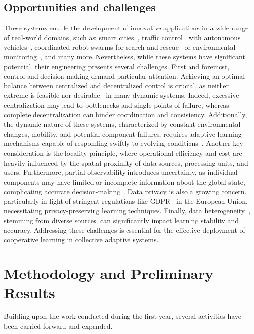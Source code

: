 \documentclass[runningheads]{llncs}
\begin{document}
\subsection{Opportunities and challenges}
These systems enable the development of innovative applications in a wide range of real-world domains, such as: 
 smart cities~\cite{DBLP:conf/icse/IftikharRBW017}, 
 traffic control~\cite{DBLP:journals/tits/ChuWCL20,DBLP:books/sp/Muller2011/ProthmannTBHMS11} 
 with autonomous vehicles~\cite{DBLP:journals/corr/BojarskiTDFFGJM16}, 
 coordinated robot swarms for search and rescue~\cite{DBLP:journals/ijon/ZhouLLXS21} 
 or environmental monitoring~\cite{DBLP:conf/acsos/AguzziVE23}, and many more.
%
Nevertheless, while these systems have significant potential, their engineering 
 presents several challenges.
%
First and foremost, control and decision-making demand particular attention.
%
Achieving an optimal balance between centralized and decentralized control is crucial, 
 as neither extreme is feasible nor desirable~\cite{DBLP:conf/coordination/CasadeiPVN19,DBLP:journals/tits/ChuWCL20,DBLP:journals/jair/LyuBXDA23} 
 in many dynamic systems. 
% 
Indeed, excessive centralization may lead to bottlenecks and single points of failure, 
 whereas complete decentralization can hinder coordination and consistency.
%
Additionally, the dynamic nature of these systems, characterized by constant 
 environmental changes, mobility, and potential component failures, requires adaptive 
 learning mechanisms capable of responding swiftly 
 to evolving conditions~\cite{DBLP:journals/swarm/PrasetyoMF19}.
%
Another key consideration is the locality principle, where operational efficiency and cost 
 are heavily influenced by the spatial proximity of data sources, processing units, and users.
%
Furthermore, partial observability introduces uncertainty, as individual components may have 
 limited or incomplete information about the global state, complicating accurate 
 decision-making~\cite{DBLP:conf/uai/HeDB22}.
%
Data privacy is also a growing concern, particularly in light of stringent regulations like GDPR~\cite{GDPR}
 in the European Union, necessitating privacy-preserving learning techniques.
%
Finally, data heterogeneity~\cite{DBLP:journals/fgcs/MaZLCQ22,DBLP:journals/ijon/ZhuXLJ21},
 stemming from diverse sources, can significantly impact learning stability and accuracy.
%
Addressing these challenges is essential for the effective deployment of cooperative learning 
 in collective adaptive systems.

\section{Methodology and Preliminary Results}\label{sec:methodology}
Building upon the work conducted during the first year, 
 several activities have been carried forward and expanded.
\end{document}
